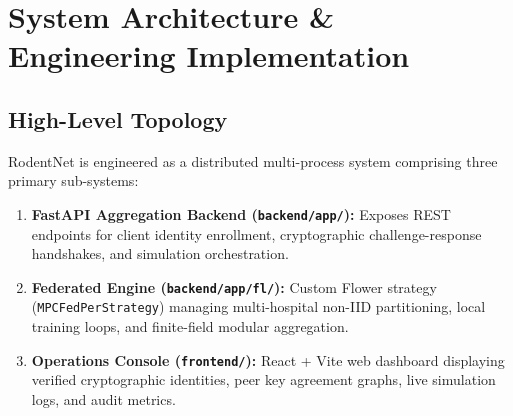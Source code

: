 \documentclass[11pt,a4paper]{report}
\begin{document}
\chapter{System Architecture \& Engineering Implementation}
\label{chap:architecture}

\section{High-Level Topology}
RodentNet is engineered as a distributed multi-process system comprising three primary sub-systems:
\begin{enumerate}[itemsep=2pt]
  \item \textbf{FastAPI Aggregation Backend (\texttt{backend/app/}):} Exposes REST endpoints for client identity enrollment, cryptographic challenge-response handshakes, and simulation orchestration.
  \item \textbf{Federated Engine (\texttt{backend/app/fl/}):} Custom Flower strategy (\lstinline|MPCFedPerStrategy|) managing multi-hospital non-IID partitioning, local training loops, and finite-field modular aggregation.
  \item \textbf{Operations Console (\texttt{frontend/}):} React + Vite web dashboard displaying verified cryptographic identities, peer key agreement graphs, live simulation logs, and audit metrics.
\end{enumerate}
\end{document}
